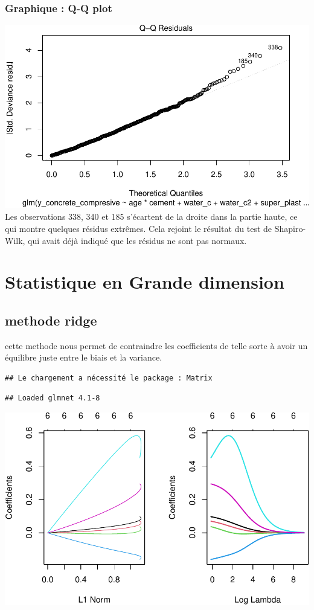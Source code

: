 \documentclass[
  12pt,
]{article}
\begin{document}
\subsubsection{Graphique : Q-Q plot}\label{graphique-q-q-plot}

\includegraphics{rmd_final_files/figure-latex/unnamed-chunk-61-1.pdf}
Les observations 338, 340 et 185 s'écartent de la droite dans la partie
haute, ce qui montre quelques résidus extrêmes. Cela rejoint le résultat
du test de Shapiro-Wilk, qui avait déjà indiqué que les résidus ne sont
pas normaux.

\section{Statistique en Grande
dimension}\label{statistique-en-grande-dimension}

\subsection{methode ridge}\label{methode-ridge}

cette methode nous permet de contraindre les coefficients de telle sorte
à avoir un équilibre juste entre le biais et la variance.

\begin{verbatim}
## Le chargement a nécessité le package : Matrix
\end{verbatim}

\begin{verbatim}
## Loaded glmnet 4.1-8
\end{verbatim}

\includegraphics{rmd_final_files/figure-latex/unnamed-chunk-62-1.pdf}
\end{document}
